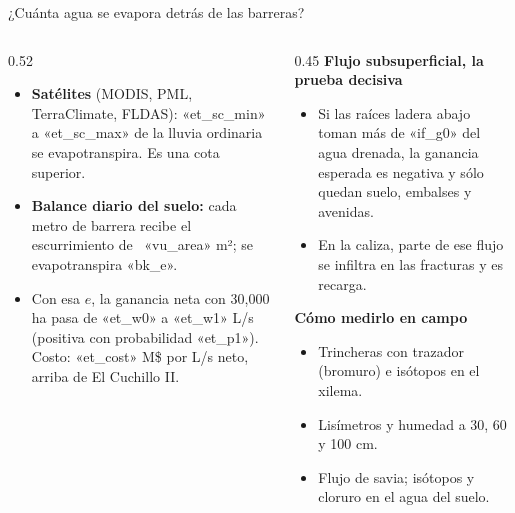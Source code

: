 \documentclass[aspectratio=169,10pt]{beamer}
\begin{document}
\begin{frame}{¿Cuánta agua se evapora detrás de las barreras?}
\begin{columns}[T]
\begin{column}{0.52\textwidth}
\small
\begin{itemize}
  \item \textbf{Satélites} (MODIS, PML, TerraClimate, FLDAS): «et_sc_min» a «et_sc_max» de la lluvia ordinaria se evapotranspira. Es una cota superior.
  \item \textbf{Balance diario del suelo:} cada metro de barrera recibe el escurrimiento de ~«vu_area» m²; se evapotranspira «bk_e».
  \item Con esa $e$, la ganancia neta con 30,000 ha pasa de «et_w0» a «et_w1» L/s (positiva con probabilidad «et_p1»). Costo: «et_cost» M\$ por L/s neto, arriba de El Cuchillo II.
\end{itemize}
\end{column}
\begin{column}{0.45\textwidth}
\footnotesize
\textbf{Flujo subsuperficial, la prueba decisiva}
\begin{itemize}
  \item Si las raíces ladera abajo toman más de «if_g0» del agua drenada, la ganancia esperada es negativa y sólo quedan suelo, embalses y avenidas.
  \item En la caliza, parte de ese flujo se infiltra en las fracturas y es recarga.
\end{itemize}
\textbf{Cómo medirlo en campo}
\begin{itemize}
  \item Trincheras con trazador (bromuro) e isótopos en el xilema.
  \item Lisímetros y humedad a 30, 60 y 100 cm.
  \item Flujo de savia; isótopos y cloruro en el agua del suelo.
\end{itemize}
\end{column}
\end{columns}
\end{frame}
\end{document}
